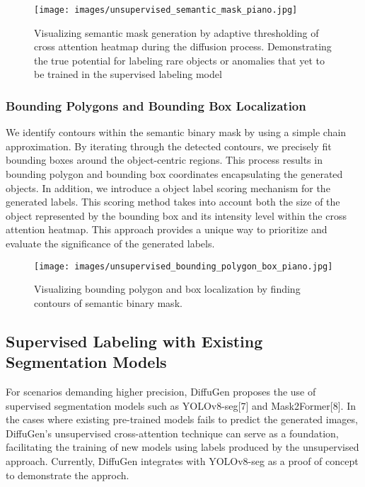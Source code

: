 \documentclass{article}
\begin{document}
\begin{figure}[H]
    \centering
    \texttt{[image: images/unsupervised\_semantic\_mask\_piano.jpg]}
    \caption{Visualizing semantic mask generation by adaptive thresholding of cross attention heatmap during the diffusion process. Demonstrating the true potential for labeling rare objects or anomalies that yet to be trained in the supervised labeling model}
    \label{fig:unsupervised_semantic_mask_piano}
\end{figure}

\subsubsection{Bounding Polygons and Bounding Box Localization}
We identify contours within the semantic binary mask by using a simple chain approximation. By iterating through the detected contours, we precisely fit bounding boxes around the object-centric regions. This process results in bounding polygon and bounding box coordinates encapsulating the generated objects.
In addition, we introduce a object label scoring mechanism for the generated labels. This scoring method takes into account both the size of the object represented by the bounding box and its intensity level within the cross attention heatmap. This approach provides a unique way to prioritize and evaluate the significance of the generated labels.

\begin{figure}[H]
    \centering
    \texttt{[image: images/unsupervised\_bounding\_polygon\_box\_piano.jpg]}
    \caption{Visualizing bounding polygon and box localization by finding contours of semantic binary mask.}
    \label{fig:unsupervised_bounding_polygon_box_piano}
\end{figure}

\subsection{Supervised Labeling with Existing Segmentation Models}
For scenarios demanding higher precision, DiffuGen proposes the use of supervised segmentation models such as YOLOv8-seg[7] and Mask2Former[8]. In the cases where existing pre-trained models fails to predict the generated images, DiffuGen's unsupervised cross-attention technique can serve as a foundation, facilitating the training of new models using labels produced by the unsupervised approach. Currently, DiffuGen integrates with YOLOv8-seg as a proof of concept to demonstrate the approch. 
\end{document}
